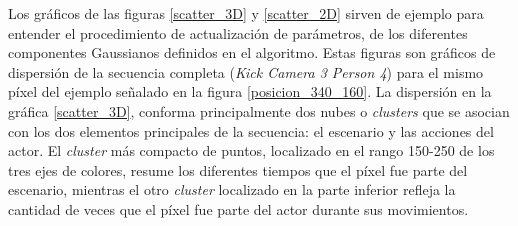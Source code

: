 Los gráficos de las figuras \ref{scatter_3D} y \ref{scatter_2D} sirven de ejemplo para entender el procedimiento de actualización de parámetros, de los diferentes componentes Gaussianos definidos en el algoritmo. Estas figuras son gráficos de dispersión de la secuencia completa (\textit{Kick Camera 3 Person 4}) para el mismo píxel del ejemplo señalado en la figura \ref{posicion_340_160}. La dispersión en la gráfica \ref{scatter_3D}, conforma principalmente dos nubes o \textit{clusters} que se asocian con los dos elementos principales de la secuencia: el escenario y las acciones del actor. El \textit{cluster} más compacto de puntos, localizado en el rango 150-250 de los tres ejes de colores, resume los diferentes tiempos que el píxel fue parte del escenario, mientras el otro \textit{cluster} localizado en la parte inferior refleja la cantidad de veces que el píxel fue parte del actor durante sus movimientos.  

